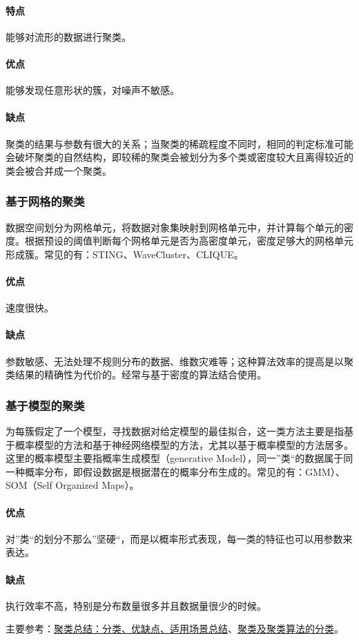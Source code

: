 \paragraph{特点}能够对流形的数据进行聚类。
	
\paragraph{优点}能够发现任意形状的簇，对噪声不敏感。

\paragraph{缺点}聚类的结果与参数有很大的关系；当聚类的稀疏程度不同时，相同的判定标准可能会破坏聚类的自然结构，即较稀的聚类会被划分为多个类或密度较大且离得较近的类会被合并成一个聚类。
	
\subsubsection{基于网格的聚类}
数据空间划分为网格单元，将数据对象集映射到网格单元中，并计算每个单元的密度。根据预设的阈值判断每个网格单元是否为高密度单元，密度足够大的网格单元形成簇。常见的有：STING、WaveCluster、CLIQUE。

\paragraph{优点}速度很快。

\paragraph{缺点}参数敏感、无法处理不规则分布的数据、维数灾难等；这种算法效率的提高是以聚类结果的精确性为代价的。经常与基于密度的算法结合使用。
	
\subsubsection{基于模型的聚类}
为每簇假定了一个模型，寻找数据对给定模型的最佳拟合，这一类方法主要是指基于概率模型的方法和基于神经网络模型的方法，尤其以基于概率模型的方法居多。这里的概率模型主要指概率生成模型（generative Model），同一”类“的数据属于同一种概率分布，即假设数据是根据潜在的概率分布生成的。常见的有：GMM）、SOM（Self Organized Maps）。

\paragraph{优点}对”类“的划分不那么”坚硬“，而是以概率形式表现，每一类的特征也可以用参数来表达。

\paragraph{缺点}执行效率不高，特别是分布数量很多并且数据量很少的时候。

主要参考：\href{https://blog.csdn.net/weixin_45440065/article/details/106358007}{聚类总结：分类、优缺点、适用场景总结}、\href{https://blog.csdn.net/count_on_me/article/details/82193745}{聚类及聚类算法的分类}。